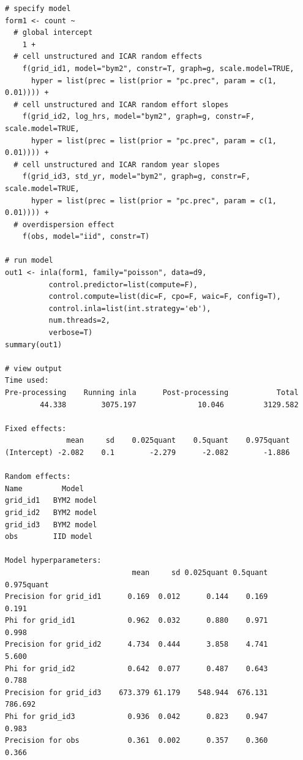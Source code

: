 \documentclass[]{article}
\begin{document}
\begin{verbatim}
# specify model
form1 <- count ~
  # global intercept
    1 +
  # cell unstructured and ICAR random effects
    f(grid_id1, model="bym2", constr=T, graph=g, scale.model=TRUE,
      hyper = list(prec = list(prior = "pc.prec", param = c(1, 0.01)))) +
  # cell unstructured and ICAR random effort slopes
    f(grid_id2, log_hrs, model="bym2", graph=g, constr=F, scale.model=TRUE,
      hyper = list(prec = list(prior = "pc.prec", param = c(1, 0.01)))) +
  # cell unstructured and ICAR random year slopes
    f(grid_id3, std_yr, model="bym2", graph=g, constr=F, scale.model=TRUE,
      hyper = list(prec = list(prior = "pc.prec", param = c(1, 0.01)))) +
  # overdispersion effect
    f(obs, model="iid", constr=T)

# run model
out1 <- inla(form1, family="poisson", data=d9,
          control.predictor=list(compute=F),
          control.compute=list(dic=F, cpo=F, waic=F, config=T),
          control.inla=list(int.strategy='eb'),
          num.threads=2,
          verbose=T)
summary(out1)

# view output
Time used:
Pre-processing    Running inla      Post-processing           Total 
        44.338        3075.197              10.046         3129.582 

Fixed effects:
              mean     sd    0.025quant    0.5quant    0.975quant
(Intercept) -2.082    0.1        -2.279      -2.082        -1.886

Random effects:
Name	     Model
grid_id1   BYM2 model 
grid_id2   BYM2 model 
grid_id3   BYM2 model 
obs        IID model 

Model hyperparameters:
                             mean     sd 0.025quant 0.5quant 0.975quant
Precision for grid_id1      0.169  0.012      0.144    0.169      0.191
Phi for grid_id1            0.962  0.032      0.880    0.971      0.998
Precision for grid_id2      4.734  0.444      3.858    4.741      5.600
Phi for grid_id2            0.642  0.077      0.487    0.643      0.788
Precision for grid_id3    673.379 61.179    548.944  676.131    786.692
Phi for grid_id3            0.936  0.042      0.823    0.947      0.983
Precision for obs           0.361  0.002      0.357    0.360      0.366
\end{verbatim}
\end{document}
